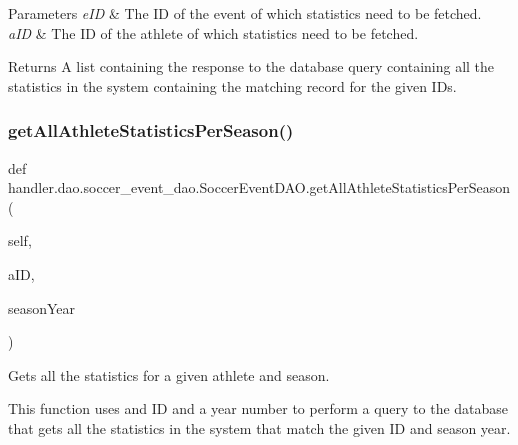 \begin{DoxyParams}{Parameters}
{\em e\+ID} & The ID of the event of which statistics need to be fetched. \\
\hline
{\em a\+ID} & The ID of the athlete of which statistics need to be fetched.\\
\hline
\end{DoxyParams}
\begin{DoxyReturn}{Returns}
A list containing the response to the database query containing all the statistics in the system containing the matching record for the given I\+Ds. 
\end{DoxyReturn}
\mbox{\label{classhandler_1_1dao_1_1soccer__event__dao_1_1_soccer_event_d_a_o_a63255f16ae44ee2964f47a8c73a0c342}} 
\subsubsection{\texorpdfstring{get\+All\+Athlete\+Statistics\+Per\+Season()}{getAllAthleteStatisticsPerSeason()}}
{\footnotesize\ttfamily def handler.\+dao.\+soccer\+\_\+event\+\_\+dao.\+Soccer\+Event\+D\+A\+O.\+get\+All\+Athlete\+Statistics\+Per\+Season (\begin{DoxyParamCaption}\item[{}]{self,  }\item[{}]{a\+ID,  }\item[{}]{season\+Year }\end{DoxyParamCaption})}



Gets all the statistics for a given athlete and season. 

This function uses and ID and a year number to perform a query to the database that gets all the statistics in the system that match the given ID and season year.


